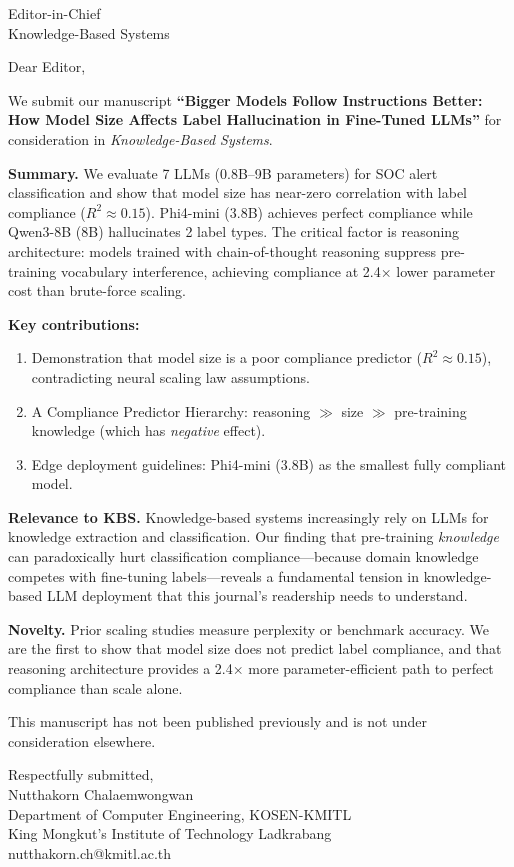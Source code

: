 \documentclass[11pt]{letter}
\begin{document}
\begin{letter}{
Editor-in-Chief \\
Knowledge-Based Systems \\
}

\opening{Dear Editor,}

We submit our manuscript \textbf{``Bigger Models Follow Instructions Better: How Model Size Affects Label Hallucination in Fine-Tuned LLMs''} for consideration in \emph{Knowledge-Based Systems}.

\textbf{Summary.} We evaluate 7 LLMs (0.8B--9B parameters) for SOC alert classification and show that model size has near-zero correlation with label compliance ($R^2 \approx 0.15$). Phi4-mini (3.8B) achieves perfect compliance while Qwen3-8B (8B) hallucinates 2 label types. The critical factor is reasoning architecture: models trained with chain-of-thought reasoning suppress pre-training vocabulary interference, achieving compliance at 2.4$\times$ lower parameter cost than brute-force scaling.

\textbf{Key contributions:}
\begin{enumerate}
\item Demonstration that model size is a poor compliance predictor ($R^2 \approx 0.15$), contradicting neural scaling law assumptions.
\item A Compliance Predictor Hierarchy: reasoning $\gg$ size $\gg$ pre-training knowledge (which has \emph{negative} effect).
\item Edge deployment guidelines: Phi4-mini (3.8B) as the smallest fully compliant model.
\end{enumerate}

\textbf{Relevance to KBS.} Knowledge-based systems increasingly rely on LLMs for knowledge extraction and classification. Our finding that pre-training \emph{knowledge} can paradoxically hurt classification compliance---because domain knowledge competes with fine-tuning labels---reveals a fundamental tension in knowledge-based LLM deployment that this journal's readership needs to understand.

\textbf{Novelty.} Prior scaling studies measure perplexity or benchmark accuracy. We are the first to show that model size does not predict label compliance, and that reasoning architecture provides a 2.4$\times$ more parameter-efficient path to perfect compliance than scale alone.

This manuscript has not been published previously and is not under consideration elsewhere.

\closing{Respectfully submitted,\\[2em]
Nutthakorn Chalaemwongwan\\
Department of Computer Engineering, KOSEN-KMITL\\
King Mongkut's Institute of Technology Ladkrabang\\
nutthakorn.ch@kmitl.ac.th
}

\end{letter}
\end{document}
